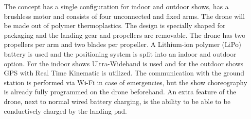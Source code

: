 The concept has a single configuration for indoor and outdoor shows, has a brushless motor and consists of four unconnected and fixed arms. The drone will be made out of polymer thermoplastics. The design is specially shaped for packaging and the landing gear and propellers are removable. The drone has two propellers per arm and two blades per propeller. A Lithium-ion polymer (LiPo) battery is used and the positioning system is split into an indoor and outdoor option. For the indoor shows Ultra-Wideband is used and for the outdoor shows GPS with Real Time Kinematic is utilized. The communication with the ground station is performed via Wi-Fi in case of emergencies, but the show choreography is already fully programmed on the drone beforehand. An extra feature of the drone, next to normal wired battery charging, is the ability to be able to be conductively charged by the landing pad.